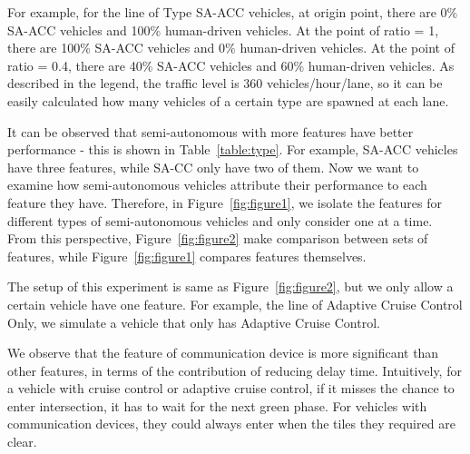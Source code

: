 For example, for the line of Type SA-ACC vehicles, at origin point,
there are 0\% SA-ACC vehicles and 100\% human-driven vehicles. At the
point of ratio = 1, there are 100\% SA-ACC vehicles and 0\%
human-driven vehicles. At the point of ratio = 0.4, there are 40\%
SA-ACC vehicles and 60\% human-driven vehicles. As described in the
legend, the traffic level is 360 vehicles/hour/lane, so it can be
easily calculated how many vehicles of a certain type are spawned at
each lane.

It can be observed that semi-autonomous with more features have better
performance - this is shown in Table~\ref{table:type}. For example,
SA-ACC vehicles have three features, while SA-CC only have two of
them. Now we want to examine how semi-autonomous vehicles attribute
their performance to each feature they have. Therefore, in
Figure~\ref{fig:figure1}, we isolate the features for different types
of semi-autonomous vehicles and only consider one at a time. From this
perspective, Figure~\ref{fig:figure2} make comparison between sets of
features, while Figure~\ref{fig:figure1} compares features themselves.

The setup of this experiment is same as Figure~\ref{fig:figure2}, but we
only allow a certain vehicle have one feature. For example, the line
of Adaptive Cruise Control Only, we simulate a vehicle that only has
Adaptive Cruise Control.

We observe that the feature of communication device is more
significant than other features, in terms of the contribution of
reducing delay time. Intuitively, for a vehicle with cruise control or
adaptive cruise control, if it misses the chance to enter
intersection, it has to wait for the next green phase. For vehicles
with communication devices, they could always enter when the tiles
they required are clear.




